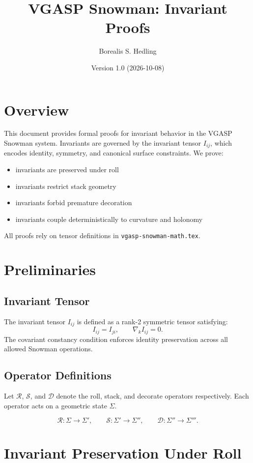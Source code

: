 \documentclass[12pt]{article}
\title{VGASP Snowman: Invariant Proofs}
\author{Borealis S. Hedling}
\date{Version 1.0 (2026-10-08)}
\begin{document}
\maketitle

\section*{Overview}
This document provides formal proofs for invariant behavior in the VGASP Snowman
system. Invariants are governed by the invariant tensor $I_{ij}$, which encodes
identity, symmetry, and canonical surface constraints. We prove:

\begin{itemize}
    \item invariants are preserved under roll
    \item invariants restrict stack geometry
    \item invariants forbid premature decoration
    \item invariants couple deterministically to curvature and holonomy
\end{itemize}

All proofs rely on tensor definitions in \texttt{vgasp-snowman-math.tex}.

\section{Preliminaries}

\subsection{Invariant Tensor}
The invariant tensor $I_{ij}$ is defined as a rank-2 symmetric tensor satisfying:
\[
I_{ij} = I_{ji}, \qquad \nabla_k I_{ij} = 0.
\]
The covariant constancy condition enforces identity preservation across all
allowed Snowman operations.

\subsection{Operator Definitions}
Let $\mathcal{R}$, $\mathcal{S}$, and $\mathcal{D}$ denote the roll, stack, and
decorate operators respectively. Each operator acts on a geometric state
$\Sigma$.

\[
\mathcal{R}: \Sigma \rightarrow \Sigma', \qquad
\mathcal{S}: \Sigma' \rightarrow \Sigma'', \qquad
\mathcal{D}: \Sigma'' \rightarrow \Sigma'''.
\]

\section{Invariant Preservation Under Roll}
\end{document}

